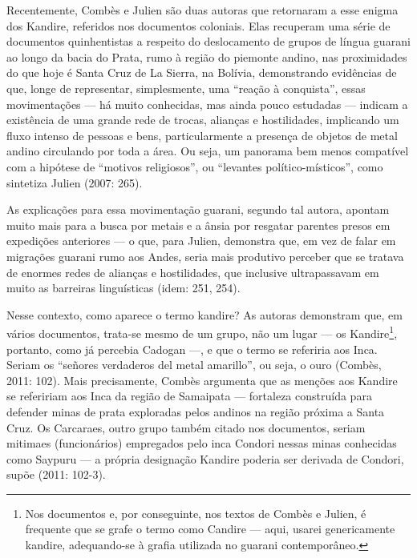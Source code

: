 \documentclass{article}
\begin{document}
Recentemente, Comb\`es e Julien s\~ao duas autoras que retornaram a esse
enigma dos Kandire, referidos nos documentos coloniais. Elas recuperam
uma s\'erie de documentos quinhentistas a respeito do deslocamento de
grupos de l\'ingua guarani ao longo da bacia do Prata, rumo \`a
regi\~ao do piemonte andino, nas proximidades do que hoje \'e Santa
Cruz de La Sierra, na Bol\'ivia, demonstrando evid\^encias de que,
longe de representar, simplesmente, uma {\textquotedblleft}rea\c{c}\~ao
\`a conquista{\textquotedblright}, essas movimenta\c{c}\~oes --- h\'a
muito conhecidas, mas ainda pouco estudadas --- indicam a exist\^encia
de uma grande rede de trocas, alian\c{c}as e hostilidades, implicando
um fluxo intenso de pessoas e bens, particularmente a presen\c{c}a de
objetos de metal andino circulando por toda a \'area. Ou seja, um
panorama bem menos compat\'ivel com a hip\'otese de
{\textquotedblleft}motivos religiosos{\textquotedblright}, ou
{\textquotedblleft}levantes pol\'itico-m\'isticos{\textquotedblright},
como sintetiza Julien (2007: 265).

As explica\c{c}\~oes para essa movimenta\c{c}\~ao guarani, segundo tal
autora, apontam muito mais para a busca por metais e a \^ansia por
resgatar parentes presos em expedi\c{c}\~oes anteriores --- o que, para
Julien, demonstra que, em vez de falar em migra\c{c}\~oes guarani rumo
aos Andes, seria mais produtivo perceber que se tratava de enormes
redes de alian\c{c}as e hostilidades, que inclusive ultrapassavam em
muito as barreiras lingu\'isticas (idem: 251, 254).

Nesse contexto, como aparece o termo kandire? As autoras demonstram que,
em v\'arios documentos, trata-se mesmo de um grupo, n\~ao um lugar ---
os Kandire\footnote{ Nos documentos e, por conseguinte, nos textos de
Comb\`es e Julien, \'e frequente que se grafe o termo como Candire ---
aqui, usarei genericamente kandire, adequando-se \`a grafia utilizada
no guarani contempor\^aneo. }, portanto, como j\'a percebia Cadogan
---, e que o termo se referiria aos Inca. Seriam os
{\textquotedblleft}se\~nores verdaderos del metal
amarillo{\textquotedblright}, ou seja, o ouro (Comb\`es, 2011: 102).
Mais precisamente, Comb\`es argumenta que as men\c{c}\~oes aos Kandire
se refeririam aos Inca da regi\~ao de Samaipata --- fortaleza
constru\'ida para defender minas de prata exploradas pelos andinos na
regi\~ao pr\'oxima a Santa Cruz. Os Carcaraes, outro grupo tamb\'em
citado nos documentos, seriam mitimaes (funcion\'arios) empregados pelo
inca Condori nessas minas conhecidas como Saypuru --- a pr\'opria
designa\c{c}\~ao Kandire poderia ser derivada de Condori, sup\~oe
(2011: 102-3).
\end{document}
